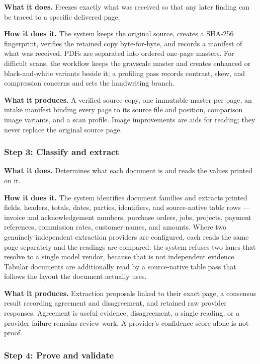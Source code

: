 \documentclass[
]{article}
\begin{document}
\textbf{What it does.} Freezes exactly what was received so that any
later finding can be traced to a specific delivered page.

\textbf{How it does it.} The system keeps the original source, creates a
SHA-256 fingerprint, verifies the retained copy byte-for-byte, and
records a manifest of what was received. PDFs are separated into ordered
one-page masters. For difficult scans, the workflow keeps the grayscale
master and creates enhanced or black-and-white variants beside it; a
profiling pass records contrast, skew, and compression concerns and sets
the handwriting branch.

\textbf{What it produces.} A verified source copy, one immutable master
per page, an intake manifest binding every page to its source file and
position, comparison image variants, and a scan profile. Image
improvements are aids for reading; they never replace the original
source page.

\subsubsection{Step 3: Classify and
extract}\label{step-3-classify-and-extract}

\textbf{What it does.} Determines what each document is and reads the
values printed on it.

\textbf{How it does it.} The system identifies document families and
extracts printed fields, headers, totals, dates, parties, identifiers,
and source-native table rows --- invoice and acknowledgement numbers,
purchase orders, jobs, projects, payment references, commission rates,
customer names, and amounts. Where two genuinely independent extraction
providers are configured, each reads the same page separately and the
readings are compared; the system refuses two lanes that resolve to a
single model vendor, because that is not independent evidence. Tabular
documents are additionally read by a source-native table pass that
follows the layout the document actually uses.

\textbf{What it produces.} Extraction proposals linked to their exact
page, a consensus result recording agreement and disagreement, and
retained raw provider responses. Agreement is useful evidence;
disagreement, a single reading, or a provider failure remains review
work. A provider's confidence score alone is not proof.

\subsubsection{Step 4: Prove and
validate}\label{step-4-prove-and-validate}
\end{document}
